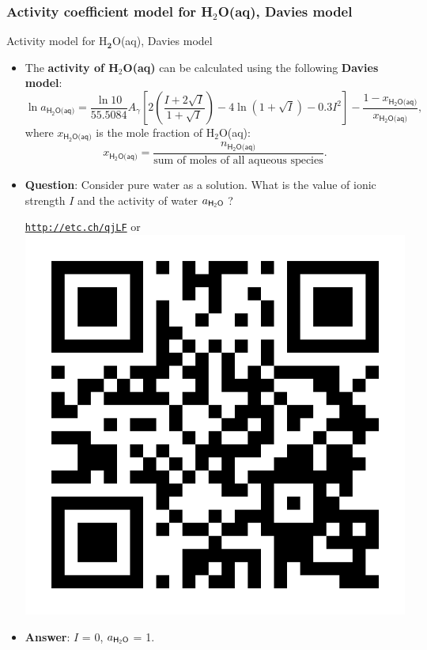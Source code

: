 \subsubsection{Activity coefficient model for H$_2$O(aq), Davies model}
%
%
\begin{frame}{Activity model for H$_{\boldsymbol{2}}$O(aq), Davies model}
\begin{itemize}
\item The \textbf{activity of H$_{2}$O(aq)} can be calculated
using the following \alert{\textbf{Davies model}}:
\[
\boxed{\ln a_{\mathsf{H_{2}O\text{(aq)}}}=\frac{\ln10}{55.5084}A_{\gamma}\left[2\left(\frac{I+2\sqrt{I}}{1+\sqrt{I}}\right)-4\ln(1+\sqrt{I})-0.3I^{2}\right]-\frac{1-x_{\mathsf{\mathsf{H_{2}O\text{(aq)}}}}}{x_{\mathsf{\mathsf{H_{2}O\text{(aq)}}}}}},
\]
where $x_{\mathsf{H_{2}O\text{(aq)}}}$ is the mole fraction of H$_{2}$O(aq):{\small{}
\[
x_{\mathsf{H_{2}O\text{(aq)}}}=\frac{n_{\mathsf{H_{2}O\text{(aq)}}}}{\text{sum of moles of all aqueous species}}.
\]
}{\small\par}
\pause
\item \alert{\textbf{Question}}: Consider pure water as a solution.
What is the value of ionic strength $I$ and the activity of water $a_{\sf H_2O}$ ?  
\begin{center}
	\href{http://etc.ch/qjLF}{\textcolor{indigo(dye)}{\tt http://etc.ch/qjLF}} \quad or \quad 
	\includegraphics[height=0.1\columnwidth]{figures/activity-models/poll-ionic-strength.png}
\end{center}
\hiddenpause
\item \textbf{Answer}: $I$ = 0, $a_{\sf H_2O}$ = 1.
\end{itemize}
\end{frame}
%
%
